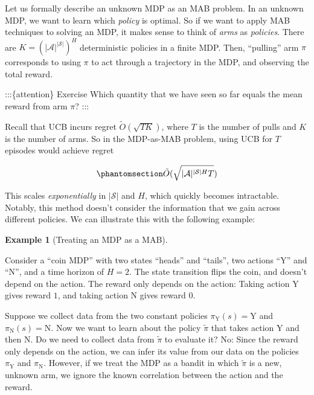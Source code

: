 \documentclass[
  letterpaper,
  DIV=11,
  numbers=noendperiod]{scrreprt}
\theoremstyle{plain}
\theoremstyle{plain}
\theoremstyle{definition}
\newtheorem{example}{Example}[chapter]
\theoremstyle{definition}
\theoremstyle{remark}
\begin{document}
Let us formally describe an unknown MDP as an MAB problem. In an unknown
MDP, we want to learn which \emph{policy} is optimal. So if we want to
apply MAB techniques to solving an MDP, it makes sense to think of
\emph{arms} as \emph{policies}. There are
\(K = (|\mathcal{A}|^{|\mathcal{S}|})^H\) deterministic policies in a
finite MDP. Then, ``pulling'' arm \(\pi\) corresponds to using \(\pi\)
to act through a trajectory in the MDP, and observing the total reward.

:::\{attention\} Exercise Which quantity that we have seen so far equals
the mean reward from arm \(\pi\)? :::

Recall that UCB incurs regret \(\tilde{O}(\sqrt{TK})\), where \(T\) is
the number of pulls and \(K\) is the number of arms. So in the
MDP-as-MAB problem, using UCB for \(T\) episodes would achieve regret

\begin{equation}\phantomsection\label{eq-mdp_as_mab}{
\tilde{O}(\sqrt{|\mathcal{A}|^{|\mathcal{S}|H} T})
}\end{equation}

This scales \emph{exponentially} in \(|\mathcal{S}|\) and \(H\), which
quickly becomes intractable. Notably, this method doesn't consider the
information that we gain across different policies. We can illustrate
this with the following example:

\begin{example}[Treating an MDP as a
MAB]\protect\hypertarget{exm-ineffective_mdp}{}\label{exm-ineffective_mdp}

Consider a ``coin MDP'' with two states ``heads'' and ``tails'', two
actions ``Y'' and ``N'', and a time horizon of \(H=2\). The state
transition flips the coin, and doesn't depend on the action. The reward
only depends on the action: Taking action Y gives reward \(1\), and
taking action N gives reward \(0\).

Suppose we collect data from the two constant policies
\(\pi_{\text{Y}}(s) = \text{Y}\) and \(\pi_{\text{N}}(s) = \text{N}\).
Now we want to learn about the policy \(\tilde{\pi}\) that takes action
Y and then N. Do we need to collect data from \(\tilde{\pi}\) to
evaluate it? No: Since the reward only depends on the action, we can
infer its value from our data on the policies \(\pi_{\text{Y}}\) and
\(\pi_{\text{N}}\). However, if we treat the MDP as a bandit in which
\(\tilde{\pi}\) is a new, unknown arm, we ignore the known correlation
between the action and the reward.

\end{example}
\end{document}
